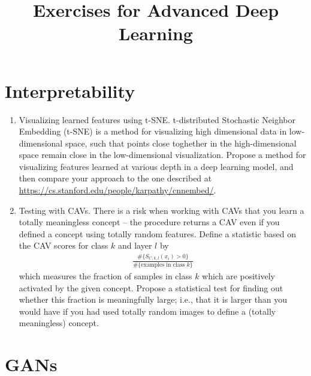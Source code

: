 \documentclass{article}
\title{Exercises for Advanced Deep Learning}
\begin{document}
\section{Interpretability}

\begin{enumerate}
\item Visualizing learned features using t-SNE. t-distributed Stochastic
  Neighbor Embedding (t-SNE) is a method for visualizing high dimensional data
  in low-dimensional space, such that points close toghether in the
  high-dimensional space remain close in the low-dimensional visualization.
  Propose a method for visualizing features learned at various depth in a deep
  learning model, and then compare your approach to the one described at
  \url{https://cs.stanford.edu/people/karpathy/cnnembed/}.

  \item Testing with CAVs. There is a risk when working with CAVs that you learn
    a totally meaningless concept -- the procedure returns a CAV even if you
    defined a concept using totally random features. Define a statistic based on
    the CAV scores for class $k$ and layer $l$ by
    \begin{align*}
      \frac{\#\{S_{C, k, l}\left(x_i\right) > 0\}}{\#\{\text{examples in class } k\}}
    \end{align*}
    which measures the fraction of samples in class $k$ which are positively
    activated by the given concept. Propose a statistical test for finding out
    whether this fraction is meaningfully large; i.e., that it is larger than
    you would have if you had used totally random images to define a (totally
    meaningless) concept.
\end{enumerate}

\section{GANs}
\end{document}
